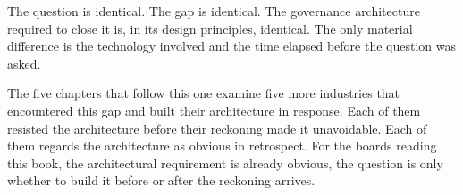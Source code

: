 The question is identical. The gap is identical. The governance architecture required to close it is, in its design principles, identical. The only material difference is the technology involved and the time elapsed before the question was asked.

The five chapters that follow this one examine five more industries that encountered this gap and built their architecture in response. Each of them resisted the architecture before their reckoning made it unavoidable. Each of them regards the architecture as obvious in retrospect. For the boards reading this book, the architectural requirement is already obvious, the question is only whether to build it before or after the reckoning arrives.
